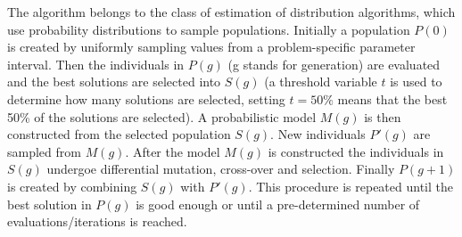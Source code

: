 The algorithm belongs to the class of estimation of distribution algorithms, which use probability distributions to sample populations. Initially a population $P(0)$ is created by uniformly sampling values from a problem-specific parameter interval. Then the individuals in $P(g)$ (g stands for generation) are evaluated and the best solutions are selected into $S(g)$ (a threshold variable $t$ is used to determine how many solutions are selected, setting $t=50\%$ means that the best 50\% of the solutions are selected). A probabilistic model $M(g)$ is then constructed from the selected population $S(g)$. New individuals $P'(g)$ are sampled from $M(g)$. After the model $M(g)$ is constructed the individuals in $S(g)$ undergoe differential mutation, cross-over and selection. Finally $P(g+1)$ is created by combining $S(g)$ with $P'(g)$. This procedure is repeated until the best solution in $P(g)$ is good enough or until a pre-determined number of evaluations/iterations is reached.
